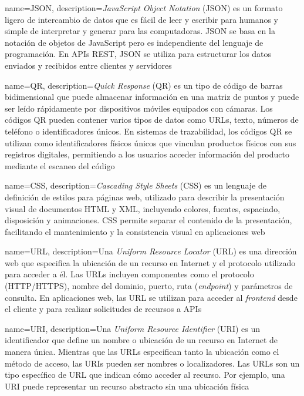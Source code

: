 {
    name=JSON,
    description={\textit{JavaScript Object Notation} (JSON) es un formato ligero de intercambio de datos que es fácil de leer y escribir para humanos y simple de interpretar y generar para las computadoras. JSON se basa en la notación de objetos de JavaScript pero es independiente del lenguaje de programación. En APIs REST, JSON se utiliza para estructurar los datos enviados y recibidos entre clientes y servidores}
}

{
    name=QR,
    description={\textit{Quick Response} (QR) es un tipo de código de barras bidimensional que puede almacenar información en una matriz de puntos y puede ser leído rápidamente por dispositivos móviles equipados con cámaras. Los códigos QR pueden contener varios tipos de datos como URLs, texto, números de teléfono o identificadores únicos. En sistemas de trazabilidad, los códigos QR se utilizan como identificadores físicos únicos que vinculan productos físicos con sus registros digitales, permitiendo a los usuarios acceder información del producto mediante el escaneo del código}
}

{
    name=CSS,
    description={\textit{Cascading Style Sheets} (CSS) es un lenguaje de definición de estilos para páginas web, utilizado para describir la presentación visual de documentos HTML y XML, incluyendo colores, fuentes, espaciado, disposición y animaciones. CSS permite separar el contenido de la presentación, facilitando el mantenimiento y la consistencia visual en aplicaciones web}
}

{
    name=URL,
    description={Una \textit{Uniform Resource Locator} (URL) es una dirección web que especifica la ubicación de un recurso en Internet y el protocolo utilizado para acceder a él. Las URLs incluyen componentes como el protocolo (HTTP/HTTPS), nombre del dominio, puerto, ruta (\textit{endpoint}) y parámetros de consulta. En aplicaciones web, las URL se utilizan para acceder al \textit{frontend} desde el cliente y para realizar solicitudes de recursos a APIs}
}

{
    name=URI,
    description={Una \textit{Uniform Resource Identifier} (URI) es un identificador que define un nombre o ubicación de un recurso en Internet de manera única. Mientras que las URLs especifican tanto la ubicación como el método de acceso, las URIs pueden ser nombres o localizadores. Las URLs son un tipo específico de URL que indican cómo acceder al recurso. Por ejemplo, una URI puede representar un recurso abstracto sin una ubicación física}
}

